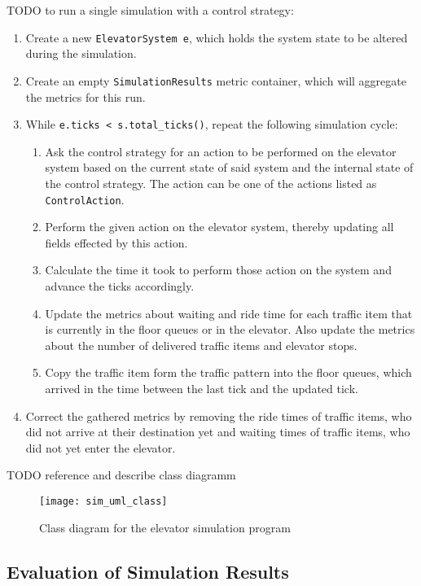 TODO
to run a single simulation with a control strategy:

\begin{enumerate}
    \item Create a new \texttt{ElevatorSystem e}, which holds the system state to be altered during the simulation.
    \item Create an empty \texttt{SimulationResults} metric container, which will aggregate the metrics for this run.
    \item While \texttt{e.ticks < s.total\_ticks()}, repeat the following simulation cycle:
    \begin{enumerate}
        \item Ask the control strategy for an action to be performed on the elevator system based on the current state of said system and the internal state of the control strategy.
        The action can be one of the actions listed as \texttt{ControlAction}.
        \item Perform the given action on the elevator system, thereby updating all fields effected by this action.
        \item Calculate the time it took to perform those action on the system and advance the ticks accordingly.
        \item Update the  metrics about waiting and ride time for each traffic item that is currently in the floor queues or in the elevator. Also update the metrics about the number of delivered traffic items and elevator stops.
        \item Copy the traffic item form the traffic pattern into the floor queues, which arrived in the time between the last tick and the updated tick.
    \end{enumerate}
    \item Correct the gathered metrics by removing the ride times of traffic items, who did not arrive at their destination yet and waiting times of traffic items, who did not yet enter the elevator.
\end{enumerate}

TODO reference and describe class diagramm

\begin{figure}[p]
    \centering
    \texttt{[image: sim\_uml\_class]}
    \caption{Class diagram for the elevator simulation program}
    \label{fig:impl:class}
\end{figure}



\subsection{Evaluation of Simulation Results}

